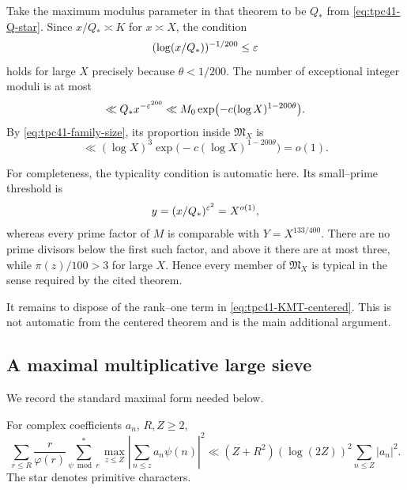Take the maximum modulus parameter in that theorem to be \(Q_*\) from
\eqref{eq:tpc41-Q-star}.  Since \(x/Q_*\asymp K\) for \(x\asymp X\),
the condition
\begin{equation}
 (\log(x/Q_*))^{-1/200}\le\varepsilon
 \label{eq:tpc41-KMT-epsilon-condition}
\end{equation}
holds for large \(X\) precisely because \(\theta<1/200\).  The number of
exceptional integer moduli is at most
\begin{equation}
 \ll Q_*x^{-\varepsilon^{200}}
 \ll M_0\exp\bigl(-c (\log X)^{1-200\theta}\bigr).
 \label{eq:tpc41-KMT-exception-count}
\end{equation}
By \eqref{eq:tpc41-family-size}, its proportion inside
\(\mathfrak M_X\) is
\begin{equation}
 \ll(\log X)^3
 \exp\bigl(-c (\log X)^{1-200\theta}\bigr)=o(1).
 \label{eq:tpc41-KMT-exception-ratio}
\end{equation}

For completeness, the typicality condition is automatic here.  Its
small--prime threshold is
\begin{equation}
 y=(x/Q_*)^{\varepsilon^2}=X^{o(1)},
 \label{eq:tpc41-typical-threshold}
\end{equation}
whereas every prime factor of \(M\) is comparable with
\(Y=X^{133/400}\).  There are no prime divisors below the first such
factor, and above it there are at most three, while \(\pi(z)/100>3\) for
large \(X\).  Hence every member of \(\mathfrak M_X\) is typical in the
sense required by the cited theorem.

It remains to dispose of the rank--one term in
\eqref{eq:tpc41-KMT-centered}.  This is not automatic from the centered
theorem and is the main additional argument.

\subsection{A maximal multiplicative large sieve}

We record the standard maximal form needed below.

\begin{lemma}
\label{lem:tpc41-maximal-large-sieve}
For complex coefficients \(a_n\), \(R,Z\ge2\),
\begin{equation}
 \sum_{r\le R}\frac r{\varphi(r)}
 \sum_{\psi\bmod r}^{*}
 \max_{z\le Z}
 \left|\sum_{n\le z}a_n\psi(n)\right|^2
 \ll
 (Z+R^2)(\log(2Z))^2\sum_{n\le Z}|a_n|^2.
 \label{eq:tpc41-maximal-large-sieve}
\end{equation}
The star denotes primitive characters.
\end{lemma}

